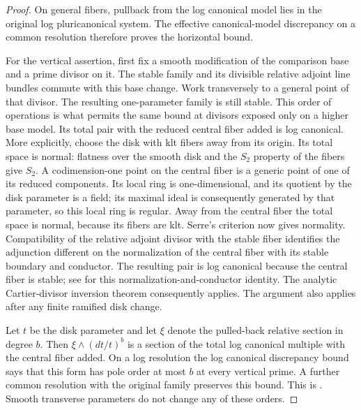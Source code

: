 \begin{proof}
On general fibers, pullback from the log canonical model lies in the
original log pluricanonical system.  The effective canonical-model
discrepancy on a common resolution therefore proves the horizontal bound.

For the vertical assertion, first fix a smooth modification of the
comparison base and a prime divisor on it.  The stable family and its
divisible relative adjoint line bundles commute with this base change.
Work transversely to a general point of that divisor.  The resulting
one-parameter family is still stable.  This order of operations is
what permits the same bound at divisors exposed only on a higher base
model.  Its total pair with the reduced
central fiber added is log canonical.  More explicitly, choose the
disk with klt fibers away from its origin.  Its total space is normal:
flatness over the smooth disk and the \(S_2\) property of the fibers
give \(S_2\).  A codimension-one point on the central fiber is a
generic point of one of its reduced components.  Its local ring is
one-dimensional, and its quotient by the disk parameter is a field;
its maximal ideal is consequently generated by that parameter, so
this local ring is regular.  Away from the central fiber the total
space is normal, because its fibers are klt.  Serre's criterion now
gives normality.
Compatibility of the relative adjoint divisor with the stable fiber
identifies the adjunction different on the normalization of the central
fiber with its stable boundary and conductor.  The resulting pair is
log canonical because the central fiber is stable; see
\cite[Lemma~2.10 and Corollary~2.11]{PatakfalviFibered} for this
normalization-and-conductor identity.
The analytic Cartier-divisor inversion theorem
\cite[Theorem~1.1]{FujinoAnalyticAdjunction} consequently applies.
The argument also applies after any finite ramified disk change.

Let \(t\) be the disk parameter and let \(\xi\) denote the
pulled-back relative section in degree \(b\).  Then
\(\xi\wedge(dt/t)^b\) is a section of the total log canonical
multiple with the central fiber added.  On a log resolution the
log canonical discrepancy bound says that this form has pole
order at most \(b\) at every vertical prime.  A further common
resolution with the original family preserves this bound.
This is .  Smooth transverse
parameters do not change any of these orders.
\end{proof}

